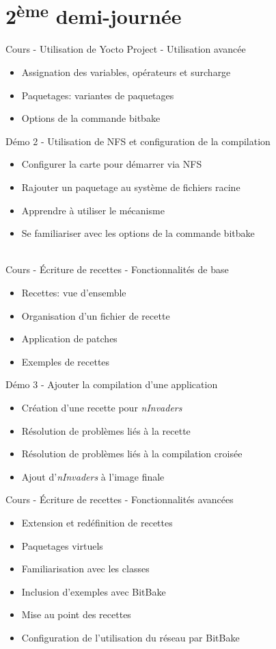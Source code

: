 \documentclass[a4paper,12pt,obeyspaces,spaces,hyphens]{article}
\begin{document}
\section{2\textsuperscript{ème} demi-journée}

\feagendatwocolumn
{Cours - Utilisation de Yocto Project - Utilisation avancée}
{
  \begin{itemize}
  \item Assignation des variables, opérateurs et surcharge
  \item Paquetages: variantes de paquetages
  \item Options de la commande bitbake
  \end{itemize}
}
{Démo 2 - Utilisation de NFS et configuration de la compilation}
{
  \begin{itemize}
  \item Configurer la carte pour démarrer via NFS
  \item Rajouter un paquetage au système de fichiers racine
  \item Apprendre à utiliser le mécanisme 
  \item Se familiariser avec les options de la commande bitbake
  \end{itemize}
}
\\

\feagendatwocolumn
{Cours - Écriture de recettes - Fonctionnalités de base}
{
  \begin{itemize}
  \item Recettes: vue d'ensemble
  \item Organisation d'un fichier de recette
  \item Application de patches
  \item Exemples de recettes
  \end{itemize}
}
{Démo 3 - Ajouter la compilation d'une application}
{
  \begin{itemize}
  \item Création d'une recette pour {\em nInvaders}
  \item Résolution de problèmes liés à la recette
  \item Résolution de problèmes liés à la compilation croisée
  \item Ajout d'{\em nInvaders} à l'image finale
  \end{itemize}
}

\feagendaonecolumn
{Cours - Écriture de recettes - Fonctionnalités avancées}
{
  \begin{itemize}
  \item Extension et redéfinition de recettes
  \item Paquetages virtuels
  \item Familiarisation avec les classes
  \item Inclusion d'exemples avec BitBake
  \item Mise au point des recettes
  \item Configuration de l'utilisation du réseau par BitBake
  \end{itemize}
}
\end{document}
